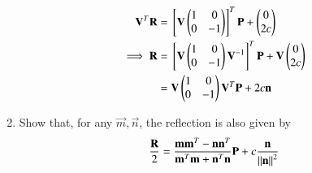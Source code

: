 \begin{enumerate}[label=\arabic*.,ref=\thesubsection.\theenumi]
\begin{align}
\label{eq:reflect_}
\mathbf{V}^T\mathbf{R} &=  {}\left[\mathbf{V}\begin{pmatrix}1 & 0 \\ 0 & -1\end{pmatrix}\right]^T\mathbf{P}+\begin{pmatrix}0 \\ 2c\end{pmatrix}
\\
\implies \mathbf{R} &= {}\left[\mathbf{V}\begin{pmatrix}1 & 0 \\ 0 & -1\end{pmatrix}\mathbf{V}^{-1}\right]^T\mathbf{P}+ \mathbf{V}\begin{pmatrix}0 \\ 2c\end{pmatrix}
\\
 &=\mathbf{V}\begin{pmatrix}1 & 0 \\ 0 & -1\end{pmatrix}\mathbf{V}^T \mathbf{P}+2c \mathbf{n}
\end{align}
\item Show that, for any $\vec{m},\vec{n}$, the reflection is also given by
\begin{align}
\label{eq:reflect_bisect}
\frac{\mathbf{R}}{2} = \frac{\mathbf{m}\mathbf{m}^T-\mathbf{n}\mathbf{n}^T}{\mathbf{m}^T\mathbf{m}+\mathbf{n}^T\mathbf{n}}\mathbf{P} + c 
\frac{\mathbf{n}}{\left\lVert\mathbf{n}\right\rVert^2}
\end{align}

\end{enumerate}
%
%
